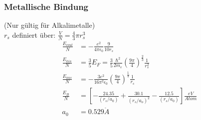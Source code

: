 \subsubsection*{Metallische Bindung}
(Nur gültig für Alkalimetalle)\\
$r_s$ definiert über: $\frac{V}{N} = \frac{4}{3} \pi r_s^3$
\begin{equation*}
    \begin{aligned}
        \frac{E_{coul}}{N} &= - \frac{e^2}{4 \pi \epsilon_0} \frac{9}{10r_s} \\
        \frac{E_{kin}}{N} &= \frac{3}{5} E_F = \frac{3}{5} \frac{\hbar^2}{2m_e} \left(\frac{9 \pi }{4}\right)^{\frac{2}{3}} \frac{1}{r_s^2}\\
        \frac{E_{aus}}{N} &= - \frac{3e^2}{16 \pi^2 \epsilon_0} \left(\frac{9 \pi}{4}\right)^{\frac{1}{3}} \frac{1}{r_s} \\
        \frac{E_B}{N} &= \left[-\frac{24.35}{(r_s/a_0)} + \frac{30.1}{(r_s/a_o)^2} - \frac{12.5}{(r_s/a_0)}\right] \frac{eV}{Atom} \\
        a_0 &= 0.529 \mathring{A}
    \end{aligned}
\end{equation*}
